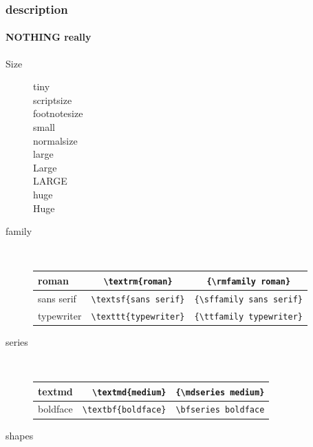 \documentclass[11pt]{beamer}
\begin{document}
\begin{frame}
\frametitle{description}
\framesubtitle{NOTHING really}
\begin{description}
\item[Size]\tiny{tiny}\\\scriptsize{scriptsize}\\\footnotesize{footnotesize}\\\small{small}
\\\normalsize{normalsize}\\\large{large}\\\Large{Large}\\\LARGE{LARGE}\\\huge{huge}\\\Huge{Huge}
\normalsize{}
\newpage
\item[family] \hfill\\
{
\begin{footnotesize}
\begin{table}[bt]
\begin{tabular}{|l|c|c|}\hline
roman& {\verb|\textrm{roman}|} & \verb|{\rmfamily roman}|\\\hline
sans serif& \verb|\textsf{sans serif}|& \verb|{\sffamily sans serif}|\\\hline
typewriter& \verb|\texttt{typewriter}|& \verb|{\ttfamily typewriter}|\\\hline
\end{tabular}
\end{table}
\end{footnotesize}
}
\item[series] \hfill\\
{
\begin{footnotesize}
\begin{table}[bt]
\begin{tabular}{|c|r|r|}\hline
textmd & \verb|\textmd{medium}| & \verb|{\mdseries medium}|\\\hline
boldface & \verb|\textbf{boldface}| & \verb|\bfseries boldface|\\\hline
\end{tabular}
\end{table}
\end{footnotesize}
}
\item[shapes] \hfill\\
{
\begin{footnotesize}
\begin{table}[bt]
\begin{tabular}{|c|r|r|}\hline

\end{tabular}
\end{table}
\end{footnotesize}}
\end{description}
\end{frame}
\end{document}
